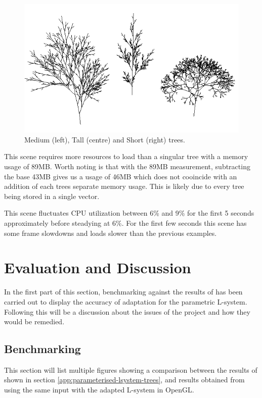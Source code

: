 \documentclass[final]{cmpreport}
\begin{document}
\begin{figure}[ht]
    \includegraphics[scale=0.7]{trees-ghi.PNG} 
    \centering
    \captionsetup{justification=centering}
    \caption{Medium (left), Tall (centre) and Short (right) trees.}
    \label{fig:trees-ghi}
\end{figure}

This scene requires more resources to load than a singular tree with a memory usage of 89MB. 
Worth noting is that with the 89MB measurement, subtracting the base 43MB gives us a usage of 
46MB which does not cooincide with an addition of each trees separate memory usage.
This is likely due to every tree being stored in a single vector.

This scene fluctuates CPU utilization between 6\% and 9\% for the first 5 seconds 
approximately before steadying at 6\%. For the first few seconds this scene has some frame 
slowdowns and loads slower than the previous examples.

\section{Evaluation and Discussion}
In the first part of this section, benchmarking against the results of \cite{prusinkiewicz1996systems} 
has been carried out to display the accuracy of adaptation for the parametric L-system. Following 
this will be a discussion about the issues of the project and how they would be remedied. 

\subsection{Benchmarking}
This section will list multiple figures showing a comparison between the results of \cite{prusinkiewicz1996systems} 
shown in section \ref{app:parameterised-lsystem-trees}, and results obtained from using the 
same input with the adapted L-system in OpenGL.
\end{document}
